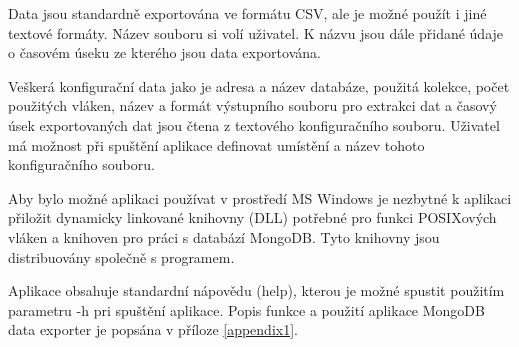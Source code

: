 Data jsou standardně exportována ve formátu CSV, ale je možné použít i jiné textové formáty. Název souboru si volí uživatel. K názvu jsou dále přidané údaje o časovém úseku ze kterého jsou data exportována.

Veškerá konfigurační data jako je adresa a název databáze, použitá kolekce, počet použitých vláken, název a formát výstupního souboru pro extrakci dat a časový úsek exportovaných dat jsou čtena z textového konfiguračního souboru. Uživatel má možnost při spuštění aplikace definovat umístění a název tohoto konfiguračního souboru. 

Aby bylo možné aplikaci používat v prostředí MS Windows je nezbytné k aplikaci přiložit dynamicky linkované knihovny (DLL) potřebné pro funkci POSIXových vláken a knihoven pro práci s databází MongoDB. Tyto knihovny jsou distribuovány společně s programem.

Aplikace obsahuje standardní nápovědu (help), kterou je možné spustit použitím parametru -h pri spuštění aplikace. Popis funkce a použití aplikace MongoDB data exporter je popsána v příloze \ref{appendix1}.